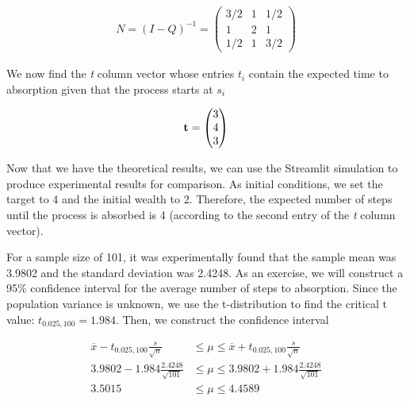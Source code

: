 \documentclass[a4paper,12pt]{article}
\theoremstyle{definition}
\let\oldtextbf\mathbf
\renewcommand{\mathbf}[1]{\oldtextbf{\boldmath #1}}
\begin{document}
	\begin{equation}
		\begin{aligned}
        	N = (I-Q)^{-1} = 
           \begin{pmatrix}
                3/2 & 1 & 1/2 \\ 
                1   & 2 & 1   \\
                1/2 & 1 & 3/2  
            \end{pmatrix}
		\end{aligned}
	\end{equation}

We now find the \emph{t} column vector whose entries $t_i$ contain the expected time to absorption given that the process starts 
at $s_i$

	\begin{equation}
		\begin{aligned}
			\mathbf{t} =
			\begin{pmatrix}
					3 \\
					4 \\
					3 \\
				\end{pmatrix}
			\end{aligned}
	\end{equation}

Now that we have the theoretical results, we can use the Streamlit simulation to produce experimental results for comparison. 
As initial conditions, we set the target to 4 and the initial wealth to 2. Therefore, the expected number of steps until the process is absorbed is 4 (according to the second entry of the \emph{t} column vector).

For a sample size of 101, it was experimentally found that the sample mean was 3.9802 and the standard deviation was 2.4248.
As an exercise, we will construct a 95\% confidence interval for the average number of steps to absorption. Since the population variance is unknown, we use the t-distribution to find the critical t value: $t_{0.025,100} = 1.984$. Then, we construct the confidence interval

	\begin{equation*}
		\begin{aligned}
		 \overline{x} - t_{0.025,100}\frac{s}{\sqrt{n}} &\leq \mu \leq \overline{x} + t_{0.025,100} \frac{s}{\sqrt{n}} \\
		 3.9802 - 1.984\frac{2.4248}{\sqrt{101}} &\leq \mu \leq 3.9802 + 1.984\frac{2.4248}{\sqrt{101}} \\
		 3.5015 &\leq \mu \leq 4.4589
		\end{aligned}
	\end{equation*}
\end{document}
